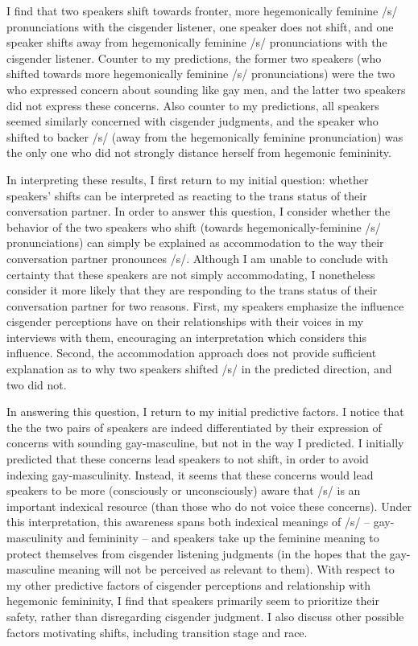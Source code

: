 \documentclass[12pt,twoside]{reedthesis}
\begin{document}
I find that two speakers shift towards fronter, more hegemonically feminine /s/ pronunciations with the cisgender listener, one speaker does not shift, and one speaker shifts away from hegemonically feminine /s/ pronunciations with the cisgender listener. Counter to my predictions, the former two speakers (who shifted towards more hegemonically feminine /s/ pronunciations) were the two who expressed concern about sounding like gay men, and the latter two speakers did not express these concerns. Also counter to my predictions, all speakers seemed similarly concerned with cisgender judgments, and the speaker who shifted to backer /s/ (away from the hegemonically feminine pronunciation) was the only one who did not strongly distance herself from hegemonic femininity.

In interpreting these results, I first return to my initial question: whether speakers' shifts can be interpreted as reacting to the trans status of their conversation partner. In order to answer this question, I consider whether the behavior of the two speakers who shift (towards hegemonically-feminine /s/ pronunciations) can simply be explained as accommodation to the way their conversation partner pronounces /s/. Although I am unable to conclude with certainty that these speakers are not simply accommodating, I nonetheless consider it more likely that they are responding to the trans status of their conversation partner for two reasons. First, my speakers emphasize the influence cisgender perceptions have on their relationships with their voices in my interviews with them, encouraging an interpretation which considers this influence. Second, the accommodation approach does not provide sufficient explanation as to why two speakers shifted /s/ in the predicted direction, and two did not.

In answering this question, I return to my initial predictive factors. I notice that the the two pairs of speakers are indeed differentiated by their expression of concerns with sounding gay-masculine, but not in the way I predicted. I initially predicted that these concerns lead speakers to not shift, in order to avoid indexing gay-masculinity. Instead, it seems that these concerns would lead speakers to be more (consciously or unconsciously) aware that /s/ is an important indexical resource (than those who do not voice these concerns). Under this interpretation, this awareness spans both indexical meanings of /s/ -- gay-masculinity and femininity -- and speakers take up the feminine meaning to protect themselves from cisgender listening judgments  (in the hopes that the gay-masculine meaning will not be perceived as relevant to them). With respect to my other predictive factors of cisgender perceptions and relationship with hegemonic femininity, I find that speakers primarily seem to prioritize their safety, rather than disregarding cisgender judgment. I also discuss other possible factors motivating shifts, including transition stage and race.
\end{document}
